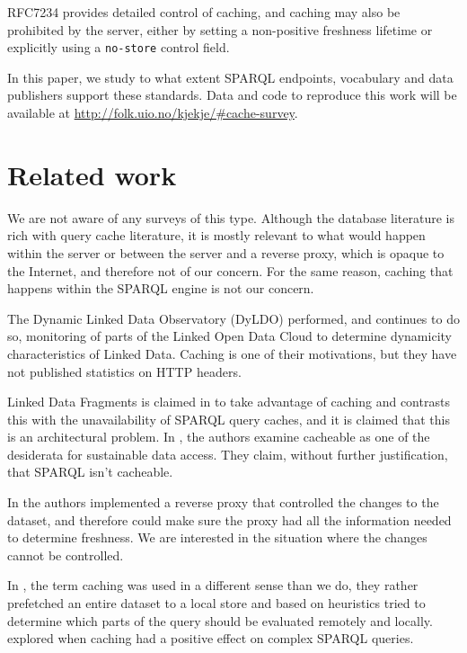 \documentclass{llncs}
\newcommand{\httph}[1]{\texttt{#1}}
\begin{document}
RFC7234 provides detailed control of caching, and caching may also be
prohibited by the server, either by setting a non-positive freshness
lifetime or explicitly using a \httph{no-store} control field.

In this paper, we study to what extent SPARQL endpoints, vocabulary
and data publishers support these standards. Data and code to
reproduce this work will be available at
\url{http://folk.uio.no/kjekje/#cache-survey}.


\section{Related work}

We are not aware of any surveys of this type. Although the database
literature is rich with query cache literature, it is mostly relevant
to what would happen within the server or between the server and a
reverse proxy, which is opaque to the Internet, and therefore not of
our concern. For the same reason, caching that happens within the
SPARQL engine is not our concern.

The Dynamic Linked Data Observatory (DyLDO) \cite{dyldo2} performed,
and continues to do so, monitoring of parts of the Linked Open Data
Cloud to determine dynamicity characteristics of Linked Data. Caching
is one of their motivations, but they have not published statistics on
HTTP headers.

Linked Data Fragments is claimed in \cite{ldf1} to take advantage of
caching and contrasts this with the unavailability of SPARQL query
caches, and it is claimed that this is an architectural problem. In
\cite{hogan2014paths}, the authors examine cacheable as one of the
desiderata for sustainable data access. They claim, without further
justification, that SPARQL isn't cacheable. 

In \cite{sparqlproxy} the authors implemented a reverse proxy that
controlled the changes to the dataset, and therefore could make sure
the proxy had all the information needed to determine freshness. We
are interested in the situation where the changes cannot be
controlled.

In \cite{umbrich2012hybrid}, the term caching was used in a different
sense than we do, they rather prefetched an entire dataset to a local
store and based on heuristics tried to determine which parts of the
query should be evaluated remotely and locally. \cite{lampo2011cache}
explored when caching had a positive effect on complex SPARQL
queries.
\end{document}
